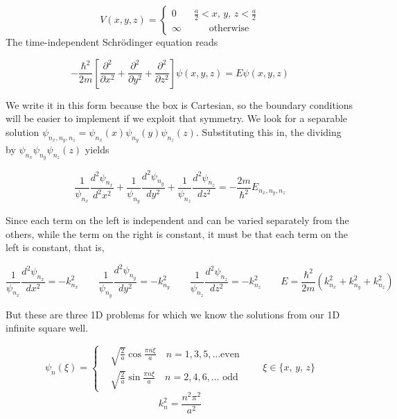 \[
V(x, y, z) = \begin{cases}
  0 \quad &\frac{a}{2} < x, \,y,\, z < \frac{a}{2} \\
  \infty &\quad\;\;\text{otherwise} 
\end{cases} 
\] \vspace{3px}
The time-independent Schr\"odinger equation reads 

\[
-\frac{\hbar^2}{2m} \left[ \frac{\partial^2 }{\partial x^2}  + \frac{\partial^2
}{\partial y^2}  + \frac{\partial^2 }{\partial z^2} \right] \psi(x, y, z)
= E\psi(x, y, z)
\] \vspace{3px}

We write it in this form because the box is Cartesian, so the boundary
conditions will be easier to implement if we exploit that symmetry. We look for
a separable solution $\psi_{n_x, n_y, n_z} = \psi_{n_x} (x) \psi_{n_y} (y)
\psi_{n_z}(z)$. Substituting this in, the dividing by $\psi_{n_x} \psi_{n_y}
\psi_{n_z}(z)$ yields 

\[
  \frac{1}{\psi_{n_x}} \frac{d^2 \psi_{n_x}}{d^2 x^2} + \frac{1}{\psi_{n_y}}
  \frac{d^2 \psi_{n_y}}{d y^2} + \frac{1}{\psi_{n_z}} \frac{d^2 \psi_{n_z}}{d
  z^2} = -\frac{2m}{\hbar^2} E_{n_x, n_y, n_z} 
\] \vspace{3px}

Since each term on the left is independent and can be varied separately from
the others, while the term on the right is constant, it must be that each term
on the left is constant, that is, 

\[
  \frac{1}{\psi_{n_x}} \frac{d^2 \psi_{n_x}}{d x^2} = -k_{n_x}^2 \qquad
  \frac{1}{\psi_{n_y}} \frac{d^2 \psi_{n_y}}{d y^2} = -k_{n_y}^2 \qquad
  \frac{1}{\psi_{n_z}} \frac{d^2 \psi_{n_z}}{d z^2} = -k_{n_z}^2 \qquad
  E = \frac{\hbar^2}{2m} \left( k_{n_x}^2 + k_{n_y}^2 + k_{n_z}^2 \right)  
\] \vspace{3px}


But these are three 1D problems for which we know the solutions from our 1D
infinite square well. 

\[
\psi_n(\xi) = \begin{cases}
  &\sqrt{\frac{2}{a}} \cos \frac{\pi n \xi}{a} \quad n = 1,3,5, \hdots \text{
  even} \\ &\sqrt{\frac{2}{a}} \sin \frac{\pi n \xi}{a} \quad n = 2,4,6,\hdots
  \text{ odd}  
\end{cases}  \qquad \xi \in \{x, \, y, \, z\}
\] \[ k_n^2 = \frac{n^2\pi^2}{a^2} \] \vspace{3px}


